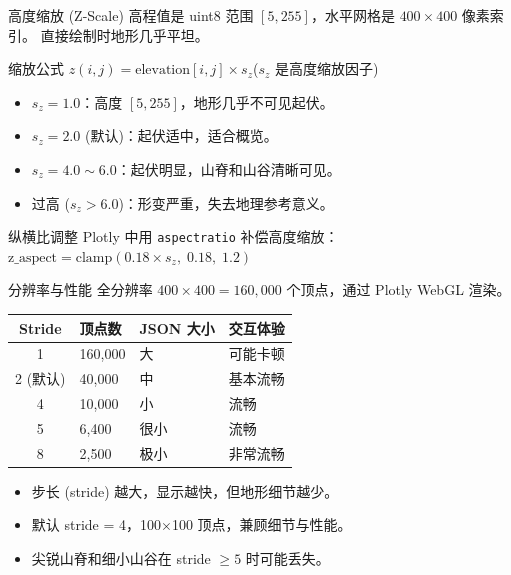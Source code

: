 \documentclass[aspectratio=169,11pt]{ctexbeamer}
\begin{document}
\begin{frame}{高度缩放 (Z-Scale)}
  高程值是 uint8 范围 $[5,255]$，水平网格是 $400\times400$ 像素索引。
  直接绘制时地形几乎平坦。

  \begin{block}{缩放公式}
    $z(i,j) = \text{elevation}[i,j] \times s_z$\quad ($s_z$ 是高度缩放因子)
  \end{block}

  \begin{itemize}
    \item $s_z = 1.0$：高度 $[5, 255]$，地形几乎不可见起伏。
    \item $s_z = 2.0$ (默认)：起伏适中，适合概览。
    \item $s_z = 4.0\sim6.0$：起伏明显，山脊和山谷清晰可见。
    \item 过高 ($s_z > 6.0$)：形变严重，失去地理参考意义。
  \end{itemize}

  \begin{block}{纵横比调整}
    Plotly 中用 \texttt{aspectratio} 补偿高度缩放：
    $\text{z\_aspect} = \text{clamp}(0.18 \times s_z,\; 0.18,\; 1.2)$
  \end{block}
\end{frame}

\begin{frame}{分辨率与性能}
  全分辨率 $400\times400 = 160{,}000$ 个顶点，通过 Plotly WebGL 渲染。

  \begin{table}
    \centering
    \begin{tabularx}{0.8\linewidth}{cXXX}
      \toprule
      Stride & 顶点数 & JSON 大小 & 交互体验 \\
      \midrule
      1 & 160,000 & 大 & 可能卡顿 \\
      2 (默认) & 40,000 & 中 & 基本流畅 \\
      4 & 10,000 & 小 & 流畅 \\
      5 & 6,400 & 很小 & 流畅 \\
      8 & 2,500 & 极小 & 非常流畅 \\
      \bottomrule
    \end{tabularx}
  \end{table}

  \begin{itemize}
    \item 步长 (stride) 越大，显示越快，但地形细节越少。
    \item 默认 stride = 4，100$\times$100 顶点，兼顾细节与性能。
    \item 尖锐山脊和细小山谷在 stride $\ge 5$ 时可能丢失。
  \end{itemize}
\end{frame}
\end{document}
